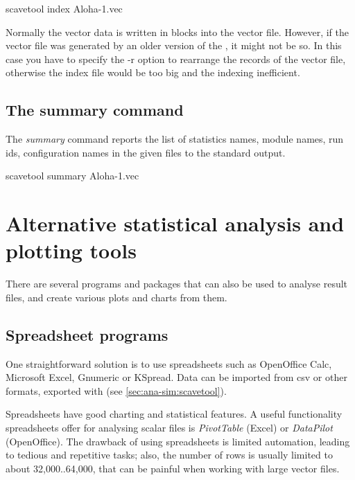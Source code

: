 \begin{commandline}
scavetool index Aloha-1.vec
\end{commandline}

Normally the vector data is written in blocks into the vector file.
However, if the vector file was generated by an older version of the
, it might not be so. In this case you have
to specify the -r option to rearrange the records of the vector file,
otherwise the index file would be too big and the indexing inefficient.

\subsection{The summary command}

The \textit{summary} command reports the list of statistics names, module names,
run ids, configuration names in the given files to the standard output.

\begin{commandline}
scavetool summary Aloha-1.vec
\end{commandline}


\section{Alternative statistical analysis and plotting tools}

There are several programs and packages that can also be used to analyse
result files, and create various plots and charts from them.


\subsection{Spreadsheet programs}

One straightforward solution is to use spreadsheets such as OpenOffice
Calc, Microsoft Excel, Gnumeric or KSpread. Data can be imported from csv
or other formats, exported with  (see
\ref{sec:ana-sim:scavetool}).

Spreadsheets have good charting and statistical features. A useful
functionality spreadsheets offer for analysing scalar files is
\textit{PivotTable} (Excel) or \textit{DataPilot} (OpenOffice). The
drawback of using spreadsheets is limited automation, leading to tedious
and repetitive tasks; also, the number of rows is usually limited to about
32,000..64,000, that can be painful when working with large vector files.


